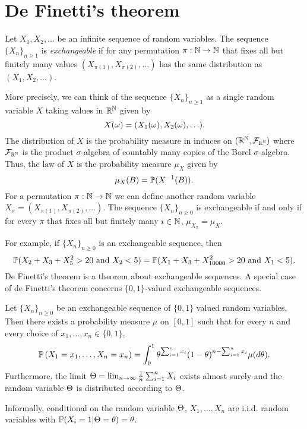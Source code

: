 \section{De Finetti's theorem}
\begin{definition}
    
Let $X_1,X_2,\ldots$ be an infinite sequence of random variables. The sequence $\{X_n\}_{n \ge 1}$ is \emph{exchangeable} if for any permutation $\pi : {{\mathbb N}} \to {{\mathbb N}}$ that fixes all but finitely many values $(X_{\pi(1)},X_{\pi(2)},\ldots)$ has the same distribution as $(X_1,X_2,\ldots)$.
\end{definition}
More precisely, we can think of the sequence $\{X_n\}_{n \ge 1}$ as a single random variable $X$ taking values in ${\mathbb R}^{{\mathbb N}}$ given by 
\[X({\omega}) = (X_1({\omega}), X_2({\omega}),\ldots).\]
The distribution of $X$ is the probability measure in induces on $({\mathbb R}^{{\mathbb N}},{\mathcal{F}}_{{\mathbb R}^{{\mathbb N}}})$ where ${\mathcal{F}}_{{\mathbb R}^{{\mathbb N}}}$ is the product $\sigma$-algebra of countably many copies of the Borel $\sigma$-algebra.  Thus, the law of $X$ is the probability measure $\mu_X$ given by
\[\mu_X(B) = {\mathbb{P}}(X^{-1}(B)). \]
For a permutation $\pi : {{\mathbb N}} \to {{\mathbb N}}$ we can define another random variable $X_\pi = (X_{\pi(1)},X_{\pi(2)},\ldots)$. The sequence $\{X_n\}_{n \ge 0}$ is exchangeable if and only if for every $\pi$ that fixes all but finitely many $i \in {{\mathbb N}}$, $\mu_{X_\pi}=\mu_X$. 

For example, if $\{X_n\}_{n \ge 0}$ is an exchangeable sequence, then
\[{\mathbb{P}}(X_2+X_3+X_5^2 > 20 \text{ and } X_2 < 5) = {\mathbb{P}}(X_1+X_3+X_{10000}^2 > 20\text{ and } X_1 < 5). \]
De Finetti's theorem is a theorem about exchangeable sequences. A special case of de Finetti's theorem concerns $\{0,1\}$-valued exchangeable sequences.
\begin{theorem}
    Let $\{X_n\}_{n \ge 0}$ be an exchangeable sequence of $\{0,1\}$ valued random variables. Then there exists a probability measure $\mu$ on $[0,1]$ such that for every $n$ and every choice of $x_1,\ldots,x_n \in \{0,1\}$,
    \[{\mathbb{P}}\left(X_1=x_1,\ldots, X_n = x_n\right) = \int_0^1 {\theta}^{\sum_{i=1}^n x_i}(1-{\theta})^{n-\sum_{i=1}^n x_i} \mu(d\theta). \]
    Furthermore, the limit ${\Theta} = \lim_{n\to \infty} \frac{1}{n}\sum_{i=1}^n X_i$ exists almost surely and the random variable ${\Theta}$ is distributed according to ${\Theta}$.
\end{theorem}
Informally, conditional on the random variable ${\Theta}$, $X_1,\ldots,X_n$ are i.i.d. random variables with ${\mathbb{P}}(X_i=1|{\Theta}={\theta})={\theta}$. 
